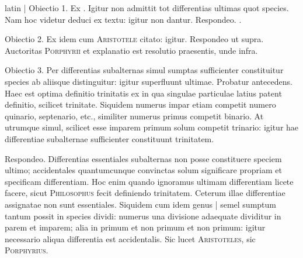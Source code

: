 \begin{otherlanguage*}{latin}
\pstart
\textnormal{|} Obiectio 1. Ex . Igitur non admittit tot differentias ultimas quot species. Nam hoc videtur deduci ex textu:
igitur non dantur. Respondeo. . 
\pend

\pstart
Obiectio 2. Ex  idem cum \textsc{Aristotele} citato:
igitur. Respondeo ut supra. Auctoritas \textsc{Porphyrii} et explanatio est resolutio praesentis, unde infra. 
\pend

\pstart
Obiectio 3. Per differentias subalternas simul sumptas sufficienter constituitur species ab aliisque distinguitur:
igitur superfluunt ultimae. Probatur antecedens. Haec est optima definitio trinitatis ex  in qua singulae particulae latius patent definitio, scilicet trinitate. Siquidem numerus impar etiam competit numero quinario, septenario, etc., similiter numerus primus competit binario. At utrumque simul, scilicet esse imparem primum solum competit trinario:
igitur hae differentiae subalternae sufficienter constituunt trinitatem. 
\pend

\pstart
Respondeo. Differentias essentiales subalternas non posse constituere speciem ultimo; accidentales quantumcunque convinctas solum significare propriam et specificam differentiam. Hoc enim quando ignoramus ultimam differentiam licete facere, sicut \textsc{Philosophus} fecit definiendo trinitatem. Ceterum illae differentiae assignatae non sunt essentiales. Siquidem cum idem genus \textnormal{|} semel sumptum tantum possit in species dividi:
numerus una divisione adaequate dividitur in parem et imparem; alia in primum et non primum et non primum:
igitur necessario aliqua differentia est accidentalis. Sic lucet \textsc{Aristoteles}, sic \textsc{Porphyrius}\index[persons]{}. 
\pend


\end{otherlanguage*}
